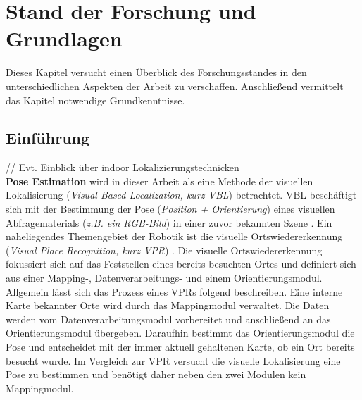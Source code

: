 \pagebreak
\section{Stand der Forschung und Grundlagen}

Dieses Kapitel versucht einen Überblick des Forschungsstandes in den unterschiedlichen Aspekten der Arbeit zu verschaffen. Anschließend vermittelt das Kapitel notwendige Grundkenntnisse.

\subsection{Einführung}



// Evt. Einblick über indoor Lokalizierungstechnicken \\

\textbf{Pose Estimation} wird in dieser Arbeit als eine Methode der visuellen Lokalisierung (\textit{Visual-Based Localization, kurz VBL}) betrachtet. VBL beschäftigt sich mit der Bestimmung der Pose (\textit{Position + Orientierung}) eines visuellen Abfragematerials (\textit{z.B. ein RGB-Bild}) in einer zuvor bekannten Szene  \cite{piascoSurveyVisualBasedLocalization2018}.
Ein naheliegendes Themengebiet der Robotik ist die visuelle Ortswiedererkennung (\textit{Visual Place Recognition, kurz VPR}) \cite{lowryVisualPlaceRecognition2016}. Die visuelle Ortswiedererkennung fokussiert sich auf das Feststellen eines bereits besuchten Ortes und definiert sich aus einer Mapping-, Datenverarbeitungs- und einem Orientierungsmodul. Allgemein lässt sich das Prozess eines VPRs folgend beschreiben. Eine interne Karte bekannter Orte wird durch das Mappingmodul verwaltet. Die Daten werden vom Datenverarbeitungsmodul vorbereitet und anschließend an das Orientierungsmodul übergeben. Daraufhin bestimmt das Orientierungsmodul die Pose und entscheidet mit der immer aktuell gehaltenen Karte, ob ein Ort bereits besucht wurde.  Im Vergleich zur VPR versucht die visuelle Lokalisierung eine Pose zu bestimmen und benötigt daher neben den zwei Modulen kein Mappingmodul.

